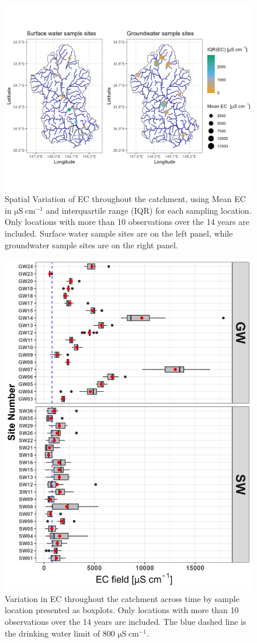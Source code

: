 \documentclass[, manuscript]{copernicus}
\begin{document}
\begin{figure}
\includegraphics[width=1\linewidth]{Figures/ec_map} \caption{Spatial Variation of EC throughout the catchment, using Mean EC in $\mathrm{\mu S~cm^{-1}}$ and interquartile range (IQR) for each sampling location. Only locations with more than 10 observations over the 14 years are included. Surface water sample sites are on the left panel, while groundwater sample sites are on the right panel. }\label{fig:ECmap}
\end{figure}

\clearpage

\begin{figure}
\includegraphics[width=0.8\linewidth]{Figures/ec_plot} \caption{Variation in EC throughout the catchment across time by sample location presented as boxplots. Only locations with more than 10 observations over the 14 years are included. The blue dashed line is the drinking water limit of 800 $\mathrm{\mu S~cm^{-1}}$.}\label{fig:ECboxplot}
\end{figure}
\end{document}
